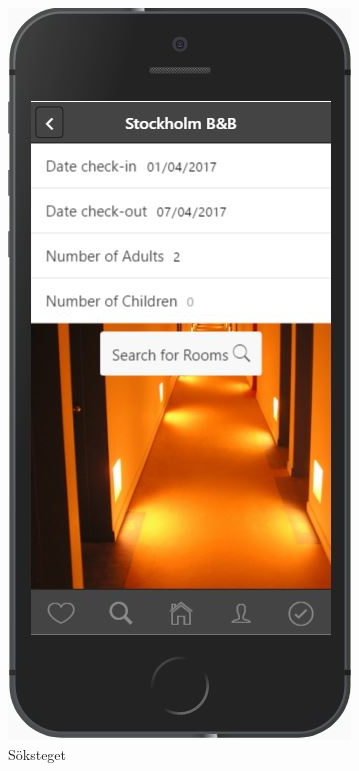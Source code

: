 \documentclass[a4paper]{article}
\begin{document}
\begin{figure}
\begin{subfigure}{.3\textwidth}
  \includegraphics[width=.8\linewidth]{search.jpg}
  \caption{Söksteget}
  \label{fig:sfig2}
\end{subfigure}
\begin{subfigure}{.3\textwidth}
  \centering

\end{subfigure}
\end{figure}
\end{document}
